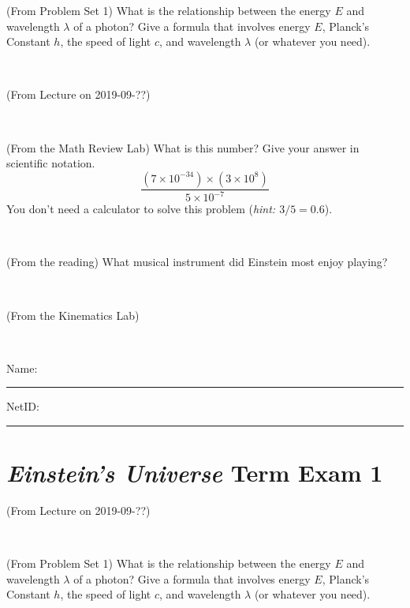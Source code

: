 \documentclass[12pt, letterpaper]{article}
\begin{document}
\begin{problem} (From Problem Set 1)
What is the relationship between the energy $E$ and wavelength
$\lambda$ of a photon? Give a formula that involves energy $E$,
Planck's Constant $h$, the speed of light $c$, and wavelength
$\lambda$ (or whatever you need).
\end{problem}

\vfill ~


\clearpage


\begin{problem} (From Lecture on 2019-09-??)
\end{problem}


\vfill ~

\begin{problem} (From the Math Review Lab)
What is this number? Give your answer in scientific notation.
$$
\frac{(7\times10^{-34})\times(3\times10^8)}{5\times10^{-7}}
$$
You don't need a calculator to solve this problem (\textit{hint: $3/5=0.6$}).
\end{problem}


\vfill ~

\begin{problem} (From the reading)
What musical instrument did Einstein most enjoy playing?
\end{problem}


\vfill ~

\begin{problem} (From the Kinematics Lab)

\end{problem}


\vfill ~


\cleardoublepage



\noindent
Name: \rule[-1ex]{0.60\textwidth}{0.1pt}
NetID: \rule[-1ex]{0.20\textwidth}{0.1pt}

\section*{\textsl{Einstein's Universe} Term Exam 1}
\setcounter{problem}{1}


\begin{problem} (From Lecture on 2019-09-??)
\end{problem}


\vfill ~

\begin{problem} (From Problem Set 1)
What is the relationship between the energy $E$ and wavelength
$\lambda$ of a photon? Give a formula that involves energy $E$,
Planck's Constant $h$, the speed of light $c$, and wavelength
$\lambda$ (or whatever you need).
\end{problem}
\end{document}
